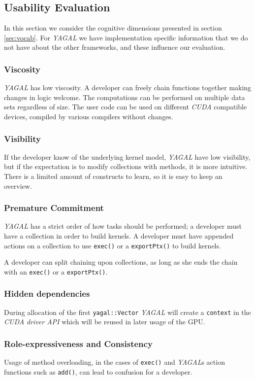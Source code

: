 \subsection{Usability Evaluation}
In this section we consider the cognitive dimensions presented in section \ref{sec:vocab}. For \textit{YAGAL} we have implementation specific information that we do not have about the other frameworks, and these influence our evaluation.

\subsubsection[*]{Viscosity}
\textit{YAGAL} has low viscosity. A developer can freely chain functions together making changes in logic welcome. The computations can be performed on multiple data sets regardless of size. The user code can be used on different \textit{CUDA} compatible devices, compiled by various compilers without changes.

\subsubsection[*]{Visibility}
If the developer know of the underlying kernel model, \textit{YAGAL} have low visibility, but if the expectation is to modify collections with methods, it is more intuitive. There is a limited amount of constructs to learn, so it is easy to keep an overview.

\subsubsection[*]{Premature Commitment}
\textit{YAGAL} has a strict order of how tasks should be performed; a developer must have a collection in order to build kernels. A developer must have appended actions on a collection to use \texttt{exec()} or a \texttt{exportPtx()} to build kernels. 

A developer can split chaining upon collections, as long as she ends the chain with an \texttt{exec()} or a \texttt{exportPtx()}.

\subsubsection[*]{Hidden dependencies}
During allocation of the first \texttt{yagal::Vector} \textit{YAGAL} will create a \texttt{context} in the \textit{CUDA driver API} which will be reused in later usage of the GPU. 

\subsubsection[*]{Role-expressiveness and Consistency}
Usage of method overloading, in the cases of \texttt{exec()} and \textit{YAGAL}s action functions such as \texttt{add()}, can lead to confusion for a developer. 

